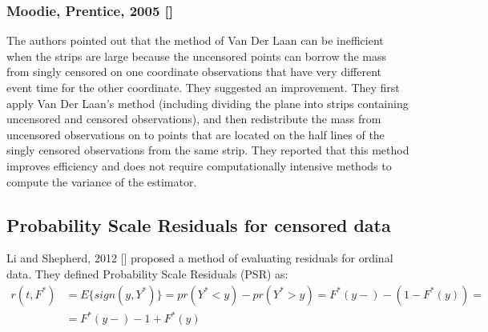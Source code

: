 \documentclass[]{article}
\begin{document}
\subsubsection{Moodie, Prentice, 2005 [\cite{moodie2005adjustment}]}
The authors pointed out that the method of Van Der Laan can be inefficient when the strips are large because the uncensored points can borrow the mass from singly censored on one coordinate observations that have very different event time for the other coordinate. They suggested an improvement. They first apply Van Der Laan's method (including dividing the plane into strips containing uncensored and censored observations), and then redistribute the mass from uncensored observations on to points that are located on the half lines of the singly censored observations from the same strip. They reported that this method improves efficiency and does not require computationally intensive methods to compute the variance of the estimator.\\






\subsection{Probability Scale Residuals for censored data}

Li and Shepherd, 2012 [\cite{li2012new}] proposed a method of evaluating residuals for ordinal data. They defined Probability Scale Residuals (PSR) as:\\
$$
\begin{aligned}
	r(t,F^*) &= E\{sign(y,Y^*)\} = pr(Y^* < y) - pr(Y^* > y) = F^*(y-) - (1-F^*(y)) =\\
	 &=F^*(y-) - 1 + F^*(y)
	\end{aligned}
$$
\end{document}
